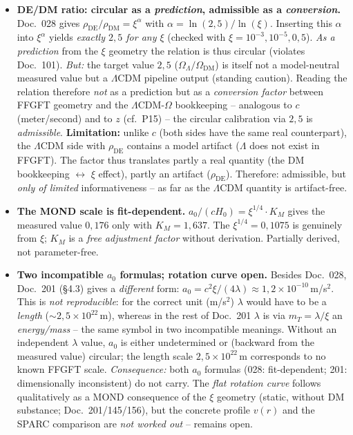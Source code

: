 \begin{itemize}
  \item \textbf{DE/DM ratio: circular as a \emph{prediction}, admissible as a
        \emph{conversion}.} Doc.~028 gives $\rho_{\text{DE}}/\rho_{\text{DM}} =
        \xi^{\alpha}$ with $\alpha = \ln(2{,}5)/\ln(\xi)$. Inserting this
        $\alpha$ into $\xi^{\alpha}$ yields \emph{exactly $2{,}5$ for any
        $\xi$} (checked with $\xi = 10^{-3}, 10^{-5}, 0{,}5$). \emph{As a
        prediction} from the $\xi$ geometry the relation is thus circular
        (violates Doc.~101). \emph{But:} the target value $2{,}5$
        ($\Omega_\Lambda/\Omega_{\text{DM}}$) is itself not a model-neutral
        measured value but a $\Lambda$CDM pipeline output (standing caution).
        Reading the relation therefore \emph{not} as a prediction but as a
        \emph{conversion factor} between FFGFT geometry and the
        $\Lambda$CDM-$\Omega$ bookkeeping -- analogous to $c$ (meter/second)
        and to $z$ (cf.\ P15) -- the circular calibration via $2{,}5$ is
        \emph{admissible}. \textbf{Limitation:} unlike $c$ (both sides have the
        same real counterpart), the $\Lambda$CDM side with $\rho_{\text{DE}}$
        contains a model artifact ($\Lambda$ does not exist in FFGFT). The
        factor thus translates partly a real quantity (the DM bookkeeping
        $\leftrightarrow$ $\xi$ effect), partly an artifact
        ($\rho_{\text{DE}}$). Therefore: admissible, but \emph{only of limited}
        informativeness -- as far as the $\Lambda$CDM quantity is artifact-free.
  \item \textbf{The MOND scale is fit-dependent.} $a_0/(cH_0) = \xi^{1/4}\cdot K_M$
        gives the measured value $0{,}176$ only with $K_M = 1{,}637$. The
        $\xi^{1/4} = 0{,}1075$ is genuinely from $\xi$; $K_M$ is a \emph{free
        adjustment factor} without derivation. Partially derived, not
        parameter-free.
  \item \textbf{Two incompatible $a_0$ formulas; rotation curve open.} Besides
        Doc.~028, Doc.~201 (§4.3) gives a \emph{different} form:
        $a_0 = c^2\xi/(4\lambda)\approx 1{,}2\times10^{-10}$\,m/s$^2$. This is
        \emph{not reproducible}: for the correct unit (m/s$^2$) $\lambda$ would
        have to be a \emph{length} ($\sim 2{,}5\times10^{22}$\,m), whereas in
        the rest of Doc.~201 $\lambda$ is via $m_T=\lambda/\xi$ an
        \emph{energy/mass} -- the same symbol in two incompatible meanings.
        Without an independent $\lambda$ value, $a_0$ is either undetermined
        or (backward from the measured value) circular; the length scale
        $2{,}5\times10^{22}$\,m corresponds to no known FFGFT scale.
        \emph{Consequence:} both $a_0$ formulas (028: fit-dependent; 201:
        dimensionally inconsistent) do not carry. The \emph{flat rotation
        curve} follows qualitatively as a MOND consequence of the $\xi$
        geometry (static, without DM substance; Doc.~201/145/156), but the
        concrete profile $v(r)$ and the SPARC comparison are \emph{not worked
        out} -- remains open.
\end{itemize}

